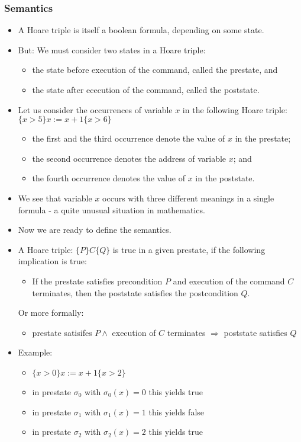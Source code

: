 \begin{multicols}{2}
\subsubsection{Semantics}
\begin{itemize}
  \item A Hoare triple is itself a boolean formula, depending on some state.
  \item But: We must consider two states in a Hoare triple:
  \begin{itemize}
    \item the state before execution of the command, called the prestate, and
    \item the state after ececution of the command, called the poststate.
  \end{itemize}
  \item Let us consider the occurrences of variable $x$ in the following Hoare triple: $\{ x > 5 \} x := x + 1 \{ x > 6 \}$
  \begin{itemize}
    \item the first and the third occurrence denote the value of $x$ in the prestate;
    \item the second occurrence denotes the address of variable $x$; and
    \item the fourth occurrence denotes the value of $x$ in the poststate.
  \end{itemize}
  \item We see that variable $x$ occurs with three different meanings in a single formula - a quite unusual situation in mathematics.
  \item Now we are ready to define the semantics.
  \item A Hoare triple: $\{ P \} C \{ Q \}$ is true in a given prestate, if the following implication is true:
  \begin{itemize}
    \item If the prestate satisfies precondition $P$ and execution of the command $C$ terminates, then the poststate satisfies the postcondition $Q$.
  \end{itemize}
  Or more formally:
  \begin{itemize}
    \item prestate satisifes $P \land$ execution of $C$ terminates $\Rightarrow$ poststate satisfies $Q$
  \end{itemize}
  \item Example:
  \begin{itemize}
    \item $\{ x > 0 \} x := x + 1 \{ x > 2 \}$
    \item [\-] in prestate $\sigma_0$ with $\sigma_0(x) = 0$ this yields true
    \item [\-] in prestate $\sigma_1$ with $\sigma_1(x) = 1$ this yields false
    \item [\-] in prestate $\sigma_2$ with $\sigma_2(x) = 2$ this yields true
  \end{itemize}
\end{itemize}


\end{multicols}
